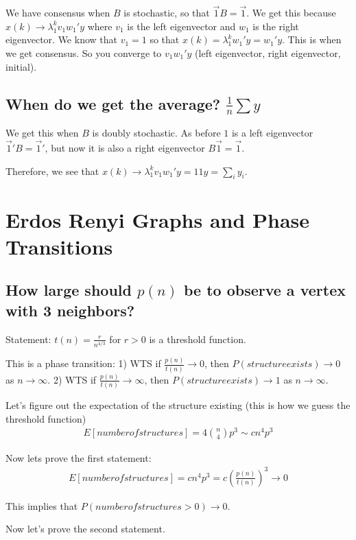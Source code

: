 \documentclass[psamsfonts]{amsart}
\begin{document}
We have consensus when $B$ is stochastic, so that $\vec{1} B = \vec{1}$. We get this because $x(k) \to \lambda_1^k v_1 w_1' y$ where $v_1$ is the left eigenvector and $w_1$ is the right eigenvector. We know that $v_1 = 1$ so that $x(k) = \lambda_1^k w_1' y = w_1' y$. This is when we get consensus. So you converge to $v_1 w_1' y$ (left eigenvector, right eigenvector, initial).

\subsection{When do we get the average? $\frac{1}{n} \sum y$}

We get this when $B$ is doubly stochastic. As before $1$ is a left eigenvector $\vec{1}' B = \vec{1}'$, but now it is also a right eigenvector $B \vec{1} = \vec{1}$.

Therefore, we see that $x(k) \to \lambda_1^k v_1 w_1' y = 1 1 y = \sum_i y_i$.

\section{Erdos Renyi Graphs and Phase Transitions}

\subsection{How large should $p(n)$ be to observe a vertex with 3 neighbors?}

Statement: $t(n) = \frac{r}{n^{4/3}}$ for $r > 0$ is a threshold function.

This is a phase transition:
1) WTS if $\frac{p(n)}{t(n)} \to 0$, then $P(structure exists) \to 0$ as $n \to \infty$.
2) WTS if $\frac{p(n)}{t(n)} \to \infty$, then $P(structure exists) \to 1$ as $n \to \infty$.

Let's figure out the expectation of the structure existing (this is how we guess the threshold function)
\begin{eqnarray}
  E[number of structures] = 4 {n \choose 4} p^3 \sim c n^4 p^3
\end{eqnarray}

Now lets prove the first statement:
\begin{eqnarray}
  E[number of structures] = c n^4 p^3 = c \left( \frac{p(n)}{t(n)} \right)^3 \to 0
\end{eqnarray}

This implies that $P(number of structures > 0) \to 0$.

Now let's prove the second statement. 
\end{document}
